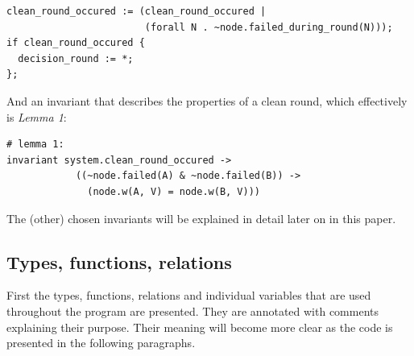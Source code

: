 \documentclass[fleqn]{article}
\begin{document}
\begin{mdframed}[nobreak=true, backgroundcolor=light-gray, roundcorner=10pt,leftmargin=1, rightmargin=1, innerleftmargin=15, innertopmargin=15,innerbottommargin=15, outerlinewidth=1, linecolor=light-gray]
\begin{lstlisting}
clean_round_occured := (clean_round_occured |
                        (forall N . ~node.failed_during_round(N)));
if clean_round_occured {
  decision_round := *;
};
\end{lstlisting}
\end{mdframed}

\noindent And an invariant that describes the properties of a clean round, which effectively is \textit{Lemma 1}:

\begin{mdframed}[nobreak=true, backgroundcolor=light-gray, roundcorner=10pt,leftmargin=1, rightmargin=1, innerleftmargin=15, innertopmargin=15,innerbottommargin=15, outerlinewidth=1, linecolor=light-gray]
\begin{lstlisting}
# lemma 1:
invariant system.clean_round_occured ->
            ((~node.failed(A) & ~node.failed(B)) ->
              (node.w(A, V) = node.w(B, V)))
\end{lstlisting}
\end{mdframed}

\noindent The (other) chosen invariants will be explained in detail later on in this paper.

\subsection{Types, functions, relations}
First the types, functions, relations and individual variables that are used throughout the program are presented. They are annotated with comments explaining their purpose.  Their meaning will become more clear as the code is presented in the following paragraphs.
\end{document}
